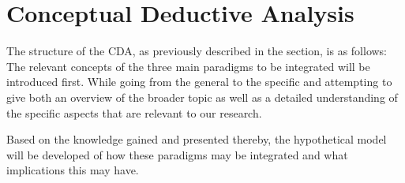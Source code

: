 \chapter{Conceptual Deductive Analysis}
\label{Conceptual Deductive Analysis}

The structure of the \ac{CDA}, as previously described in the  section, is as follows:
The relevant concepts of the three main paradigms to be integrated will be introduced first.
While going from the general to the specific and attempting to give both an overview of the broader topic
as well as a detailed understanding of the specific aspects that are relevant to our research.

Based on the knowledge gained and presented thereby,
the hypothetical model will be developed of how these paradigms may be integrated and what implications this may have.









\pagebreak